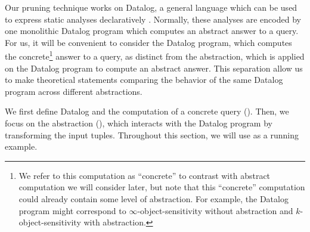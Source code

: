 
Our pruning technique works on Datalog, a general language which can be used to
express static analyses declaratively \cite{Whaley2007,bravenboer}.  Normally,
these analyses are encoded by one monolithic Datalog program which computes an
abstract answer to a query.  For us, it will be convenient to consider the
Datalog program, which computes the concrete\footnote{We refer to this computation as ``concrete''
to contrast with abstract computation we will consider later,
but note that this ``concrete'' computation
could already contain some level of abstraction.
For example, the Datalog program might correspond to $\infty$-object-sensitivity
without abstraction and $k$-object-sensitivity with abstraction.
}
answer to a query, as distinct
from the abstraction, which is applied on the Datalog program to compute an
abstract answer.  This separation allow us to make theoretical statements
comparing the behavior of the same Datalog program across different
abstractions.

We first define Datalog and the computation of a concrete query
().  Then, we focus on the abstraction (),
which interacts with the Datalog program by transforming the input tuples.
Throughout this section, we will use  as a running example.

